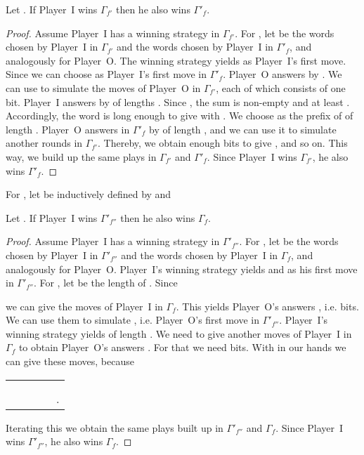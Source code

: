 \documentclass[fleqn,envcountsame]{LMCS}
\newcommand{\pI}{Player~I\xspace}
\newcommand{\pO}{Player~O\xspace}
\newcommand{\Gd}[1]{\ensuremath{\Gamma_{#1}}\xspace}
\newcommand{\Gp}[1]{\ensuremath{\Gamma'_{#1}}\xspace}
\newcommand{\ie}{i.e.\xspace}
\begin{document}
\begin{prop}\label{prop:G_f_prime_G_prime_f}
Let . If \pI wins \Gd{f'} then he also wins \Gp{f}.
\end{prop}
\begin{proof}
Assume \pI has a winning strategy in \Gd{f'}. For , let
 be the words chosen by \pI in \Gd{f'} and  the words
chosen by \pI in \Gp{f}, and analogously  for \pO.
The winning strategy yields  as \pI's first move.
Since  we can choose  as \pI's first move
in \Gp{f}. \pO answers by . We can use  to
simulate the moves  of \pO in \Gd{f'},
each of which consists of one bit. \pI answers by
 of lengths .
Since , the sum  is non-empty and
at least . Accordingly, the word  is
long enough to give  with .
We choose  as the prefix of  of length .
\pO answers in \Gp{f} by  of length , and we can use it to
simulate another  rounds in \Gd{f'}. Thereby, we obtain enough
bits to give , and so on. This way, we build up the same plays
in \Gd{f'} and \Gp{f}. Since \pI wins \Gd{f'}, he also wins \Gp{f}.
\end{proof}

For , let  be inductively defined by 
and 
\begin{prop}\label{prop:G_prime_f_prime_prime_G_f}
Let . If \pI wins \Gp{f''} then he also wins \Gd{f}.
\end{prop}
\begin{proof}
Assume \pI has a winning strategy in \Gp{f''}. For , let
 be the words chosen by \pI in \Gp{f''} and  the words
chosen by \pI in \Gd{f}, and analogously   for \pO.
\pI's winning strategy yields  and
 as his first move in \Gp{f''}.
For , let  be the length of .
Since

we can give the moves  of \pI in \Gd{f}. This
yields \pO's answers , \ie  bits. We
can use them to simulate , \ie \pO's first move in
\Gp{f''}. \pI's winning strategy yields  of length . We need to give another  moves of \pI in
\Gd{f} to obtain \pO's answers . For
that we need  bits. With  in our
hands we can give these moves, because
\begin{center}
\begin{tabular}{rcccl}
 &  &  &  & \\
	& & &  & \\
	& & &  & .
\end{tabular}
\end{center}
Iterating this we obtain the same plays built up in \Gp{f''} and
\Gd{f}. Since \pI wins \Gp{f''}, he also wins \Gd{f}.
\end{proof}
\end{document}
